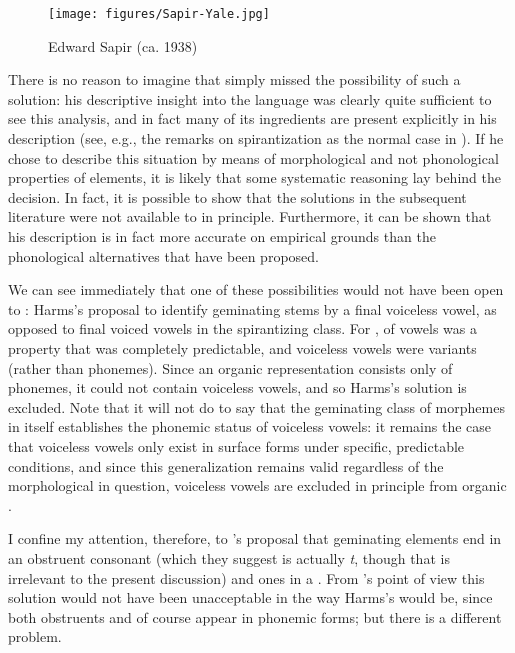 \begin{wrapfigure}{r}{.4\textwidth}
  \texttt{[image: figures/Sapir-Yale.jpg]}
  \caption{Edward Sapir (ca. 1938)}
  \label{fig:ch.sapir.sapir_yale}
\end{wrapfigure}
There is no reason to imagine that {\Sapir} simply missed the possibility
of such a solution: his descriptive insight into the language was
clearly quite sufficient to see this analysis, and in fact many of its
ingredients are present explicitly in his description (see, e.g., the
remarks on spirantization as the normal case in
\citealt[63f.]{sapir30:s.paiute}). If he chose to describe this
situation by means of morphological and not phonological properties of
elements, it is likely that some systematic reasoning lay behind the
decision. In fact, it is possible to show that the solutions in the
subsequent literature were not available to {\Sapir} in
principle. Furthermore, it can be shown that his description is in
fact more accurate on empirical grounds than the phonological
alternatives that have been proposed.

We can see immediately that one of these possibilities would not have
been open to {\Sapir}: Harms's proposal to identify geminating stems by a
final voiceless vowel, as opposed to final voiced vowels in the
spirantizing class. For {\Sapir},  of vowels was a property that
was completely predictable, and voiceless vowels were variants (rather
than phonemes). Since an organic representation consists only of
phonemes, it could not contain voiceless vowels, and so Harms's
solution is excluded. Note that it will not do to say that the
geminating class of morphemes in itself establishes the phonemic
status of voiceless vowels: it remains the case that voiceless vowels
only exist in surface forms under specific, predictable conditions,
and since this generalization remains valid regardless of the
morphological  in question, voiceless vowels are excluded
in principle from organic .

I confine my attention, therefore, to \citeauthor{spe}'s proposal
that geminating elements end in an obstruent consonant (which they
suggest is actually \emph{t}, though that is irrelevant to the present
discussion) and  ones in a . From {\Sapir}'s
point of view this solution would not have been unacceptable in the
way Harms's would be, since both obstruents and  of
course appear in phonemic forms; but there is a different problem.


